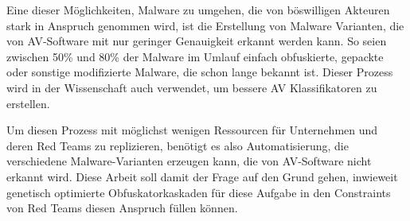 Eine dieser Möglichkeiten, Malware zu umgehen, die von böswilligen Akteuren stark in Anspruch genommen wird, ist die Erstellung von Malware Varianten, die von AV-Software mit nur geringer Genauigkeit erkannt werden kann. So seien zwischen 50\%\cite{cesare_2013_malwisean, baterdene_2017_packer} und 80\% \cite{kang_2020_a} der Malware im Umlauf einfach obfuskierte, gepackte oder sonstige modifizierte Malware, die schon lange bekannt ist. Dieser Prozess wird in der Wissenschaft auch verwendet, um bessere AV Klassifikatoren zu erstellen\cite{murali_2023_evolving}.

Um diesen Prozess mit möglichst wenigen Ressourcen für Unternehmen und deren Red Teams zu replizieren, benötigt es also Automatisierung, die verschiedene Malware-Varianten erzeugen kann, die von AV-Software nicht erkannt wird. Diese Arbeit soll damit der Frage auf den Grund gehen, inwieweit genetisch optimierte Obfuskatorkaskaden für diese Aufgabe in den Constraints von Red Teams diesen Anspruch füllen können.
